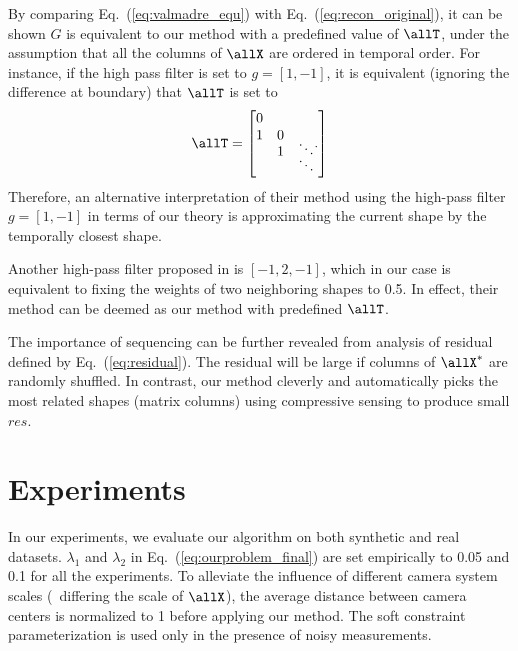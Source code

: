By comparing Eq.~(\ref{eq:valmadre_equ}) with Eq.~(\ref{eq:recon_original}), it can be shown $G$ is equivalent to our method with a predefined value of $\allT$, under the assumption that all the columns of $\allX$ are ordered in temporal order. 
For instance,  if the high pass filter is set to $g=[1,-1]$, it is equivalent (ignoring the difference at boundary) that $\allT$ is set to
\begin{equation}
\allT = \left[
\begin{matrix}
0 &   & \\
1 & 0 & \\[-7pt]
  &	1 & \ddots \\[-7pt]
  &   & \ddots 
\end{matrix}.
\right]
\end{equation}
Therefore, an alternative interpretation of their method \cite{Valmadre_CVPR2012} using the high-pass filter $g=[1,-1]$ in terms of our theory is approximating the current shape by the temporally closest shape. 

Another high-pass filter proposed in \cite{Valmadre_CVPR2012} is $[-1, 2, -1]$, which in our case is equivalent to fixing the weights of two neighboring shapes to 0.5. %
In effect, their method can be deemed as our method with predefined $\allT$. 

The importance of sequencing can be further revealed from analysis of residual defined by Eq.~(\ref{eq:residual}). The residual will be large if columns of $\allX^*$ are randomly shuffled. In contrast, our method cleverly and automatically picks the most related shapes (matrix columns) using compressive sensing to produce small $res$.





\section{Experiments} \label{sec:experiment}
In our experiments, we evaluate our algorithm on both synthetic and real datasets. $\lambda_1$ and $\lambda_2$ in Eq.~(\ref{eq:ourproblem_final}) are set empirically to 0.05 and 0.1 for all the experiments. To alleviate the influence of different camera system scales (\ie~differing the scale of $\allX$), the average distance between camera centers is normalized to 1 before applying our method. The soft constraint parameterization is used only in the presence of noisy measurements.

